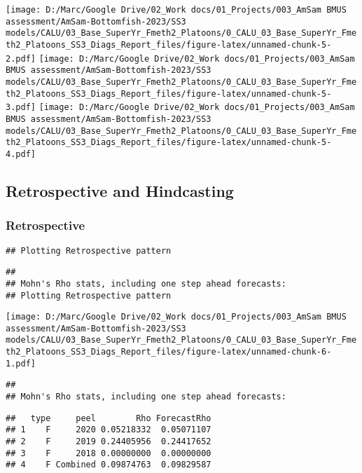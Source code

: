 \documentclass[
]{article}
\begin{document}
\texttt{[image: D:/Marc/Google Drive/02\_Work docs/01\_Projects/003\_AmSam BMUS assessment/AmSam-Bottomfish-2023/SS3 models/CALU/03\_Base\_SuperYr\_Fmeth2\_Platoons/0\_CALU\_03\_Base\_SuperYr\_Fmeth2\_Platoons\_SS3\_Diags\_Report\_files/figure-latex/unnamed-chunk-5-2.pdf]}
\texttt{[image: D:/Marc/Google Drive/02\_Work docs/01\_Projects/003\_AmSam BMUS assessment/AmSam-Bottomfish-2023/SS3 models/CALU/03\_Base\_SuperYr\_Fmeth2\_Platoons/0\_CALU\_03\_Base\_SuperYr\_Fmeth2\_Platoons\_SS3\_Diags\_Report\_files/figure-latex/unnamed-chunk-5-3.pdf]}
\texttt{[image: D:/Marc/Google Drive/02\_Work docs/01\_Projects/003\_AmSam BMUS assessment/AmSam-Bottomfish-2023/SS3 models/CALU/03\_Base\_SuperYr\_Fmeth2\_Platoons/0\_CALU\_03\_Base\_SuperYr\_Fmeth2\_Platoons\_SS3\_Diags\_Report\_files/figure-latex/unnamed-chunk-5-4.pdf]}

\hypertarget{retrospective-and-hindcasting}{%
\subsection{Retrospective and
Hindcasting}\label{retrospective-and-hindcasting}}

\hypertarget{retrospective}{%
\subsubsection{Retrospective}\label{retrospective}}

\begin{verbatim}
## Plotting Retrospective pattern
\end{verbatim}

\begin{verbatim}
## 
## Mohn's Rho stats, including one step ahead forecasts:
## Plotting Retrospective pattern
\end{verbatim}

\texttt{[image: D:/Marc/Google Drive/02\_Work docs/01\_Projects/003\_AmSam BMUS assessment/AmSam-Bottomfish-2023/SS3 models/CALU/03\_Base\_SuperYr\_Fmeth2\_Platoons/0\_CALU\_03\_Base\_SuperYr\_Fmeth2\_Platoons\_SS3\_Diags\_Report\_files/figure-latex/unnamed-chunk-6-1.pdf]}

\begin{verbatim}
## 
## Mohn's Rho stats, including one step ahead forecasts:
\end{verbatim}

\begin{verbatim}
##   type     peel        Rho ForecastRho
## 1    F     2020 0.05218332  0.05071107
## 2    F     2019 0.24405956  0.24417652
## 3    F     2018 0.00000000  0.00000000
## 4    F Combined 0.09874763  0.09829587
\end{verbatim}
\end{document}
